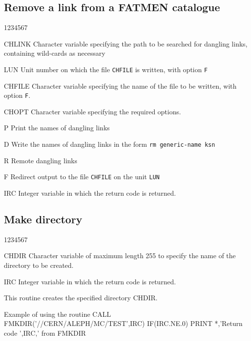 \subsection{Remove a link from a FATMEN catalogue}
\begin{DLtt}{1234567}
\item[CHLINK]Character variable specifying the path to be searched
for dangling links, containing wild-cards as necessary
\item[LUN]Unit number on which the file {\tt CHFILE} is written,
with option {\tt F}
\item[CHFILE]
Character variable specifying the name of the file to be written,
with option {\tt F}.
\item[CHOPT]
Character variable specifying the required options.
\begin{DLtt}{12}
\item[P]Print the names of dangling links
\item[D]Write the names of dangling links in the form {\tt rm generic-name ksn}
\item[R]Remote dangling links
\item[F]Redirect output to the file {\tt CHFILE} on the unit {\tt LUN}
\end{DLtt}
\item[IRC]
Integer variable in which the return code is returned.
\end{DLtt}

\subsection{Make directory}


\begin{DLtt}{1234567}
\item[CHDIR]
Character variable of maximum length 255 to specify the name of the
directory to be created.
\item[IRC]
Integer variable in which the return code is returned.
\end{DLtt}

This routine creates the specified directory CHDIR.
\begin{XMPt}{Example of using the routine \protect{}}
      CALL FMKDIR('//CERN/ALEPH/MC/TEST',IRC)
      IF(IRC.NE.0) PRINT *,'Return code ',IRC,' from FMKDIR
\end{XMPt}

